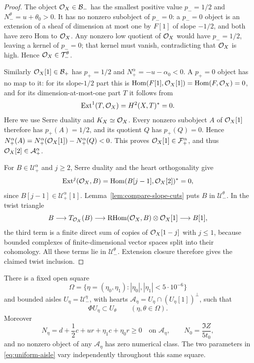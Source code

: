 \begin{proof}
The object $\mathcal O_X\in\mathcal B_-$ has the smallest positive value
$p_-=1/2$ and $N_-^\theta=u+\theta_0>0$.
It has no nonzero subobject of $p_-=0$: a $p_-=0$ object is an
extension of a sheaf of dimension at most one by $F[1]$ of slope
$-1/2$, and both have zero Hom to $\mathcal O_X$.
Any nonzero low quotient of $\mathcal O_X$ would have $p_-=1/2$, leaving
a kernel of $p_-=0$; that kernel must vanish, contradicting that
$\mathcal O_X$ is high.  Hence $\mathcal O_X\in\mathcal T_-^\theta$.

Similarly $\mathcal O_X[1]\in\mathcal B_+$ has $p_+=1/2$ and
$N_+^\alpha=-u-\alpha_0<0$.  A $p_+=0$ object has no map to it:
for its slope-$1/2$ part this is
$\operatorname{Hom}(F[1],\mathcal O_X[1])=\operatorname{Hom}(F,\mathcal O_X)=0$, and for its
dimension-at-most-one part $T$ it follows from
\[
 \operatorname{Ext}^1(T,\mathcal O_X)=H^2(X,T)^*=0.
\]
Here we use Serre duality and $K_X\simeq\mathcal O_X$.  Every nonzero
subobject $A$ of $\mathcal O_X[1]$ therefore has $p_+(A)=1/2$, and its
quotient $Q$ has $p_+(Q)=0$.  Hence
$N_+^\alpha(A)=N_+^\alpha(\mathcal O_X[1])-N_+^\alpha(Q)<0$.
This proves $\mathcal O_X[1]\in\mathcal F_+^\alpha$, and thus
$\mathcal O_X[2]\in\mathcal A_+^\alpha$.

For $B\in\mathcal U_+^\alpha$ and $j\geq2$, Serre duality and
the heart orthogonality give
\[
 \operatorname{Ext}^j(\mathcal O_X,B)
       =\operatorname{Hom}(B[j-1],\mathcal O_X[2])^*=0,
\]
since $B[j-1]\in\mathcal U_+^\alpha[1]$.
Lemma~\ref{lem:compare-slope-cuts} puts $B$ in
$\mathcal U_-^\theta$.  In the twist triangle
\[
 B\longrightarrow T_{\mathcal O_X}(B)\longrightarrow
          \operatorname{RHom}(\mathcal O_X,B)\otimes\mathcal O_X[1]\longrightarrow B[1],
\]
the third term is a finite direct sum of copies of
$\mathcal O_X[1-j]$ with $j\leq1$, because bounded complexes of
finite-dimensional vector spaces split into their cohomology.
All these terms lie in $\mathcal U_-^\theta$.  Extension closure
therefore gives the claimed twist inclusion.
\end{proof}

\begin{proposition}
\label{prop:uniform-aisle}
There is a fixed open square
\begin{equation}\label{eq:fixed-omega}
 \Omega=\{\eta=(\eta_0,\eta_1):|\eta_0|,|\eta_1|<5\cdot10^{-6}\}
\end{equation}
and bounded aisles $U_\eta=\mathcal U_-^\eta$, with hearts
$\mathcal A_\eta=U_\eta\cap(U_\eta[1])^\perp$, such that
\begin{equation}\label{eq:uniform-aisle}
                    \Phi U_\eta\subset U_\theta
                    \qquad(\eta,\theta\in\Omega).
\end{equation}
Moreover
\begin{equation}\label{eq:perturbed-positive-form}
 N_\eta=d+\frac12c+ur+\eta_1c+\eta_0r\geq0
                    \quad\text{on }\mathcal A_\eta,
 \qquad N_0=\frac{\Im Z}{5t_0},
\end{equation}
and no nonzero object of any $\mathcal A_\eta$ has zero numerical
class.  The two parameters in \eqref{eq:uniform-aisle} vary
independently throughout this same square.
\end{proposition}

